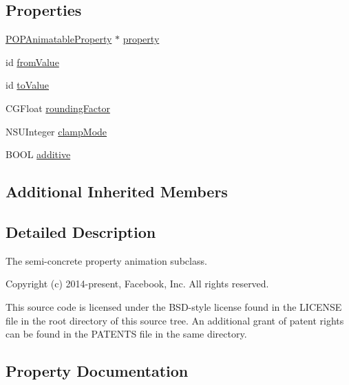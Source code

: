 \subsection*{Properties}
\begin{DoxyCompactItemize}
\item 
\mbox{\hyperlink{interface_p_o_p_animatable_property}{P\+O\+P\+Animatable\+Property}} $\ast$ \mbox{\hyperlink{interface_p_o_p_property_animation_a84277734179328f03be50a362f493082}{property}}
\item 
id \mbox{\hyperlink{interface_p_o_p_property_animation_aeb388bcf2599e1325982f3a76b153b9d}{from\+Value}}
\item 
id \mbox{\hyperlink{interface_p_o_p_property_animation_aeaebfaa7cade680e9bc7eca0bef0756a}{to\+Value}}
\item 
C\+G\+Float \mbox{\hyperlink{interface_p_o_p_property_animation_a14751fc182bfacadf13daa2d93c46ee5}{rounding\+Factor}}
\item 
N\+S\+U\+Integer \mbox{\hyperlink{interface_p_o_p_property_animation_a24deb27bdfe50717e78dd4b45a14c34f}{clamp\+Mode}}
\item 
B\+O\+OL \mbox{\hyperlink{interface_p_o_p_property_animation_a86276c6efc833e551bf7f889e3a9ec0a}{additive}}
\end{DoxyCompactItemize}
\subsection*{Additional Inherited Members}


\subsection{Detailed Description}
The semi-\/concrete property animation subclass.

Copyright (c) 2014-\/present, Facebook, Inc. All rights reserved.

This source code is licensed under the B\+S\+D-\/style license found in the L\+I\+C\+E\+N\+SE file in the root directory of this source tree. An additional grant of patent rights can be found in the P\+A\+T\+E\+N\+TS file in the same directory. 

\subsection{Property Documentation}
\mbox{\label{interface_p_o_p_property_animation_a86276c6efc833e551bf7f889e3a9ec0a}} 
